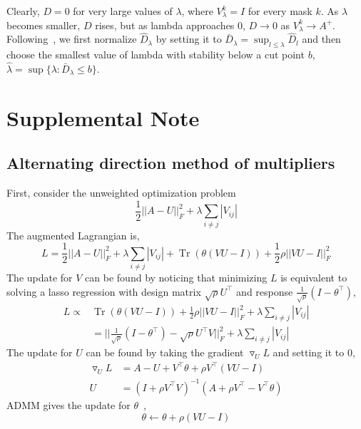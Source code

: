 \documentclass{article}
\DeclareMathOperator{\Tr}{Tr}
\newcommand{\beginsupplement}{%
        \setcounter{table}{0}
        \renewcommand{\thetable}{S\arabic{table}}%
        \setcounter{figure}{0}
        \renewcommand{\thefigure}{S\arabic{figure}}%
     }
\begin{document}
Clearly, $D = 0$ for very large values of $\lambda$, where $V^k_\lambda = I$
for every mask $k$. As $\lambda$ becomes smaller, $D$ rises, but as lambda approaches $0$,
$D\rightarrow 0$ as $V^k_\lambda \rightarrow A^+$. Following~\cite{Liu2010},
we first normalize $\hat{D}_\lambda$ by setting it to
$\bar{D}_\lambda = \sup_{l \leq \lambda} \hat{D}_l$ and then choose the smallest
value of lambda with stability below a cut point $b$,
$\hat{\lambda} = \sup \{ \lambda : \bar{D}_\lambda \leq b \}$.


\printbibliography

\beginsupplement
\section*{Supplemental Note}
\subsection*{Alternating direction method of multipliers}\label{note}
First, consider the unweighted optimization problem
\begin{equation}
\frac{1}{2} ||A - U||_F^2 + \lambda \sum_{i\neq j}|V_{ij}|
\end{equation}
The augmented Lagrangian is,
\begin{equation*}
L = \frac{1}{2} ||A - U||_F^2 +
   \lambda \sum_{i\neq j}|V_{ij}| +
   \Tr(\theta(VU-I)) + 
   \frac{1}{2} \rho ||VU-I||_F^2
\end{equation*}
The update for $V$ can be found by noticing that minimizing $L$ is equivalent
to solving a lasso regression with design matrix $\sqrt{\rho} U^\top$ and
response $\frac{1}{\sqrt{\rho}}(I-\theta^\top)$,
\begin{align*}
   L \propto& \Tr(\theta(VU-I)) + 
     \frac{1}{2} \rho ||VU-I||_F^2 + \lambda \sum_{i\neq j}|V_{ij}| \\
   &= ||\frac{1}{\sqrt{\rho}}(I-\theta^\top) -
      \sqrt{\rho} U^\top V||_F^2 + \lambda \sum_{i\neq j}|V_{ij}|
\end{align*}
The update for $U$ can be found by taking the gradient $\triangledown_U L$
and setting it to 0,
\begin{align*}
\triangledown_U L &= A - U + V^\top \theta + \rho V^\top(VU-I) \\
U &= (I + \rho V^{\top} V)^{-1}(A + \rho V^\top - V^\top \theta)
\end{align*}
ADMM gives the update for $\theta$~\cite{Boyd2010},
\begin{equation}
\theta \leftarrow \theta + \rho(VU-I)
\end{equation}
\end{document}
